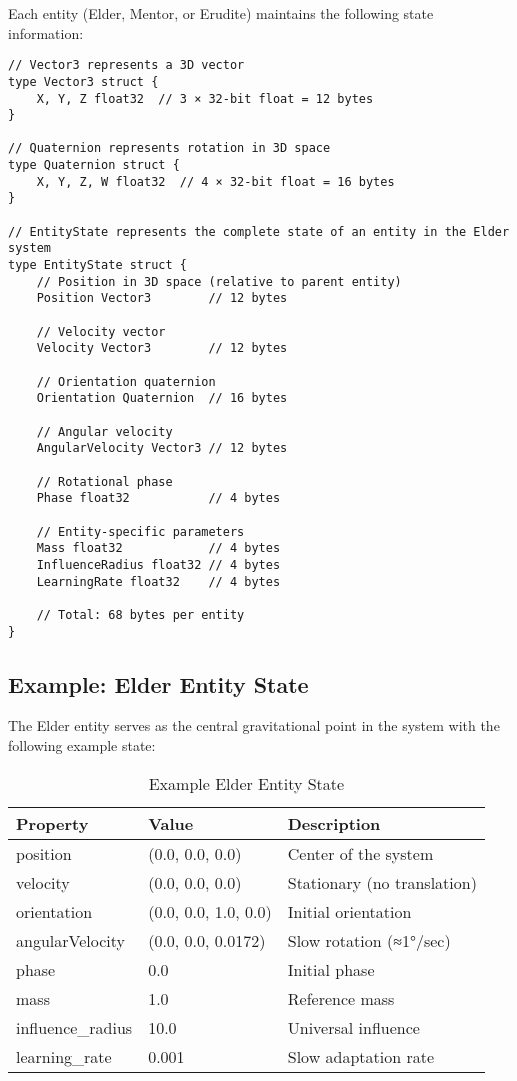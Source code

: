 Each entity (Elder, Mentor, or Erudite) maintains the following state information:

\begin{tcolorbox}[colback=CodeBackground, colframe=DarkGray, title=Entity State Data Structure in Go, fonttitle=\bfseries]
\begin{verbatim}
// Vector3 represents a 3D vector
type Vector3 struct {
    X, Y, Z float32  // 3 × 32-bit float = 12 bytes
}

// Quaternion represents rotation in 3D space
type Quaternion struct {
    X, Y, Z, W float32  // 4 × 32-bit float = 16 bytes
}

// EntityState represents the complete state of an entity in the Elder system
type EntityState struct {
    // Position in 3D space (relative to parent entity)
    Position Vector3        // 12 bytes
    
    // Velocity vector
    Velocity Vector3        // 12 bytes
    
    // Orientation quaternion
    Orientation Quaternion  // 16 bytes
    
    // Angular velocity
    AngularVelocity Vector3 // 12 bytes
    
    // Rotational phase
    Phase float32           // 4 bytes
    
    // Entity-specific parameters
    Mass float32            // 4 bytes
    InfluenceRadius float32 // 4 bytes
    LearningRate float32    // 4 bytes
    
    // Total: 68 bytes per entity
}
\end{verbatim}
\end{tcolorbox}

\subsection{Example: Elder Entity State}

The Elder entity serves as the central gravitational point in the system with the following example state:

\begin{table}[h]
\centering
\begin{tabular}{|l|l|l|}
\hline
\textbf{Property} & \textbf{Value} & \textbf{Description} \\
\hline
position & (0.0, 0.0, 0.0) & Center of the system \\
velocity & (0.0, 0.0, 0.0) & Stationary (no translation) \\
orientation & (0.0, 0.0, 1.0, 0.0) & Initial orientation \\
angularVelocity & (0.0, 0.0, 0.0172) & Slow rotation (≈1°/sec) \\
phase & 0.0 & Initial phase \\
mass & 1.0 & Reference mass \\
influence\_radius & 10.0 & Universal influence \\
learning\_rate & 0.001 & Slow adaptation rate \\
\hline
\end{tabular}
\caption{Example Elder Entity State}
\end{table}

